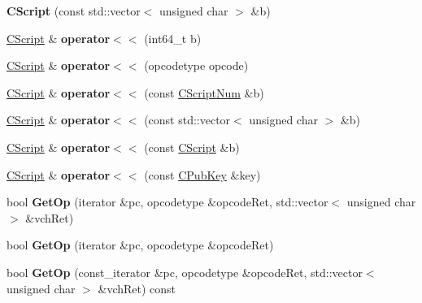 \begin{DoxyCompactItemize}
{\bfseries C\+Script} (const std\+::vector$<$ unsigned char $>$ \&b)
\item 
\mbox{\label{class_c_script_aafde904eee737599e8b4f98c4a9d1043}} 
\mbox{\hyperlink{class_c_script}{C\+Script}} \& {\bfseries operator$<$$<$} (int64\+\_\+t b)
\item 
\mbox{\label{class_c_script_af22201e1171b6390b4a06678d00c78d3}} 
\mbox{\hyperlink{class_c_script}{C\+Script}} \& {\bfseries operator$<$$<$} (opcodetype opcode)
\item 
\mbox{\label{class_c_script_a3324c3ce4a32c0f76b45c791a039b6fd}} 
\mbox{\hyperlink{class_c_script}{C\+Script}} \& {\bfseries operator$<$$<$} (const \mbox{\hyperlink{class_c_script_num}{C\+Script\+Num}} \&b)
\item 
\mbox{\label{class_c_script_a6e58790e9f280dd7272ca0d81459b6ef}} 
\mbox{\hyperlink{class_c_script}{C\+Script}} \& {\bfseries operator$<$$<$} (const std\+::vector$<$ unsigned char $>$ \&b)
\item 
\mbox{\label{class_c_script_aa47d739da94465950b3977c04a49f089}} 
\mbox{\hyperlink{class_c_script}{C\+Script}} \& {\bfseries operator$<$$<$} (const \mbox{\hyperlink{class_c_script}{C\+Script}} \&b)
\item 
\mbox{\label{class_c_script_a90ca62e4cd7e8c6e90a397f42d6b0564}} 
\mbox{\hyperlink{class_c_script}{C\+Script}} \& {\bfseries operator$<$$<$} (const \mbox{\hyperlink{class_c_pub_key}{C\+Pub\+Key}} \&key)
\item 
\mbox{\label{class_c_script_a94635ed93d8d244ec3acfa83f9ecfe5f}} 
bool {\bfseries Get\+Op} (iterator \&pc, opcodetype \&opcode\+Ret, std\+::vector$<$ unsigned char $>$ \&vch\+Ret)
\item 
\mbox{\label{class_c_script_a913b6f84ecb7ae584200279fa0c064a9}} 
bool {\bfseries Get\+Op} (iterator \&pc, opcodetype \&opcode\+Ret)
\item 
\mbox{\label{class_c_script_ae07231780831ba57f723bd35e4572753}} 
bool {\bfseries Get\+Op} (const\+\_\+iterator \&pc, opcodetype \&opcode\+Ret, std\+::vector$<$ unsigned char $>$ \&vch\+Ret) const

\end{DoxyCompactItemize}
